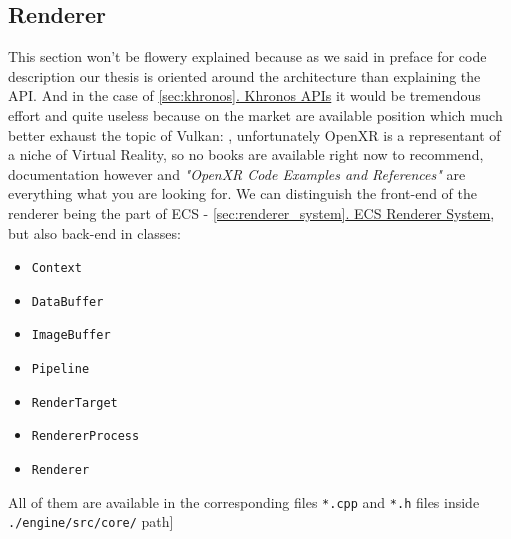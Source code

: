 \newpage
\subsection{Renderer}
This section won't be flowery explained because as we said in preface for code description our thesis is oriented around the architecture than explaining the API. And in the case of \hyperref[sec:khronos]{\ref*{sec:khronos}. Khronos APIs} it would be tremendous effort and quite useless because on the market are available position which much better exhaust the topic of Vulkan: \cite{VulkanCookbook}, unfortunately OpenXR is a representant of a niche of Virtual Reality, so no books are available right now to recommend, documentation however and \textit{"OpenXR Code Examples and References"} \cite{OpenXrExamples} are everything what you are looking for.
\label{sec:renderer}
We can distinguish the front-end of the renderer being the part of ECS - \hyperref[sec:renderer_system]{\ref*{sec:renderer_system}. ECS Renderer System}, but also back-end in classes:
\begin{itemize}
    \item \texttt{Context}
    \item \texttt{DataBuffer}
    \item \texttt{ImageBuffer}
    \item \texttt{Pipeline}
    \item \texttt{RenderTarget}
    \item \texttt{RendererProcess}
    \item \texttt{Renderer}
\end{itemize}
All of them are available in the corresponding files \texttt{*.cpp} and \texttt{*.h} files inside \texttt{./engine/src/core/} path]

